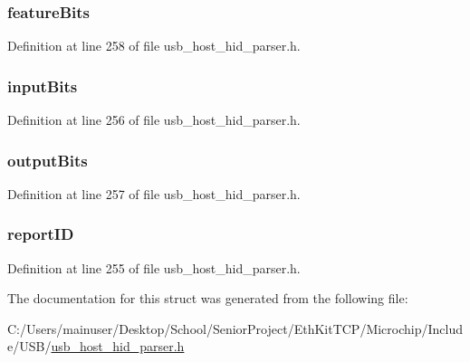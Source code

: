 \subsubsection[{feature\+Bits}]{ feature\+Bits}\label{struct___h_i_d___r_e_p_o_r_t_afbfbc33b8fb0cd296f94fcccbfe7d296}


Definition at line 258 of file usb\+\_\+host\+\_\+hid\+\_\+parser.\+h.

\hypertarget{struct___h_i_d___r_e_p_o_r_t_a9bc78c44a5e28c5a59a7087dc11c5bb8}{}
\subsubsection[{input\+Bits}]{ input\+Bits}\label{struct___h_i_d___r_e_p_o_r_t_a9bc78c44a5e28c5a59a7087dc11c5bb8}


Definition at line 256 of file usb\+\_\+host\+\_\+hid\+\_\+parser.\+h.

\hypertarget{struct___h_i_d___r_e_p_o_r_t_ab8b179101fa292f0fefb80dbabb74875}{}
\subsubsection[{output\+Bits}]{ output\+Bits}\label{struct___h_i_d___r_e_p_o_r_t_ab8b179101fa292f0fefb80dbabb74875}


Definition at line 257 of file usb\+\_\+host\+\_\+hid\+\_\+parser.\+h.

\hypertarget{struct___h_i_d___r_e_p_o_r_t_aebdb6c1d16fff393bae351f5b2c4dabc}{}
\subsubsection[{report\+I\+D}]{ report\+I\+D}\label{struct___h_i_d___r_e_p_o_r_t_aebdb6c1d16fff393bae351f5b2c4dabc}


Definition at line 255 of file usb\+\_\+host\+\_\+hid\+\_\+parser.\+h.



The documentation for this struct was generated from the following file\+:\begin{DoxyCompactItemize}
\item 
C\+:/\+Users/mainuser/\+Desktop/\+School/\+Senior\+Project/\+Eth\+Kit\+T\+C\+P/\+Microchip/\+Include/\+U\+S\+B/\hyperlink{usb__host__hid__parser_8h}{usb\+\_\+host\+\_\+hid\+\_\+parser.\+h}\end{DoxyCompactItemize}
